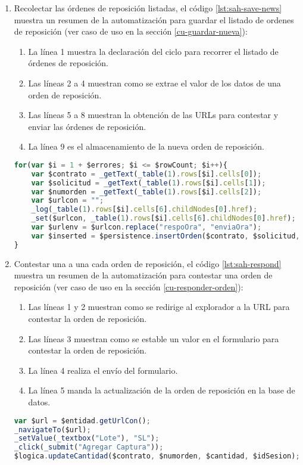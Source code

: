 \begin{enumerate}
	\item Recolectar las órdenes de reposición listadas, el código \ref{lst:sah-save-news} muestra un resumen de la automatización para guardar el listado de ordenes de reposición (ver caso de uso en la sección \ref{cu-guardar-nueva}):
	\begin{enumerate}
		\item La línea 1 muestra la declaración del ciclo para recorrer el listado de órdenes de reposición.
		\item Las líneas 2 a 4 muestran como se extrae el valor de los datos de una orden de reposición.
		\item Las líneas 5 a 8 muestran la obtención de las URLs para contestar y enviar las órdenes de reposición.
		\item La línea 9 es el almacenamiento de la nueva orden de reposición. 
	\end{enumerate}
	\begin{lstlisting}[language=Javascript, caption={Guardar lista de órdenes de reposición.}, label={lst:sah-save-news}]
for(var $i = 1 + $errores; $i <= $rowCount; $i++){
	var $contrato = _getText(_table(1).rows[$i].cells[0]);
	var $solicitud = _getText(_table(1).rows[$i].cells[1]);
	var $numorden = _getText(_table(1).rows[$i].cells[2]);
	var $urlcon = "";
	_log(_table(1).rows[$i].cells[6].childNodes[0].href);
	_set($urlcon, _table(1).rows[$i].cells[6].childNodes[0].href);
	var $urlenv = $urlcon.replace("respoOra", "enviaOra");
	var $inserted = $persistence.insertOrden($contrato, $solicitud, $numorden, $expedicion, $almacen, $urlcon, $urlenv, $idSesion);
}
	\end{lstlisting}

	\item Contestar una a una cada orden de reposición, el código \ref{lst:sah-respond} muestra un resumen de la automatización para contestar una orden de reposición (ver caso de uso en la sección \ref{cu-responder-orden}):
	\begin{enumerate}
		\item Las líneas 1 y 2 muestran como se redirige al explorador a la URL para contestar la orden de reposición.
		\item  Las líneas 3 muestran como se estable un valor en el formulario para contestar la orden de reposición.
		\item La línea 4 realiza el envío del formulario.
		\item La línea 5 manda la actualización de la orden de reposición en la base de datos.
	\end{enumerate}
	\begin{lstlisting}[language=Javascript, caption={Responder orden de reposición.}, label={lst:sah-respond}]
var $url = $entidad.getUrlCon();
_navigateTo($url);
_setValue(_textbox("Lote"), "SL");
_click(_submit("Agregar Captura"));
$logica.updateCantidad($contrato, $numorden, $cantidad, $idSesion);
	\end{lstlisting}


\end{enumerate}
